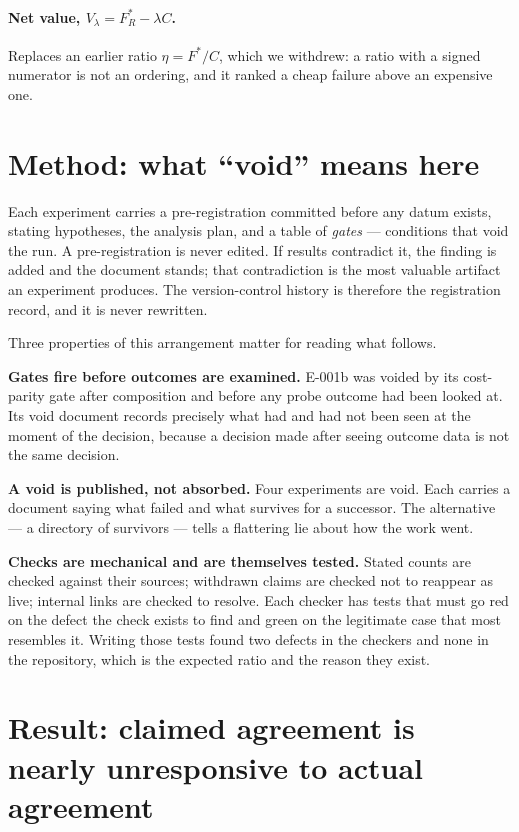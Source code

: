 \documentclass[11pt]{article}
\begin{document}
\paragraph{Net value, $V_\lambda = F^*_R - \lambda C$.} Replaces an earlier ratio
$\eta = F^*/C$, which we withdrew: a ratio with a signed numerator is not an
ordering, and it ranked a cheap failure above an expensive one.

\section{Method: what ``void'' means here}
\label{sec:method}

Each experiment carries a pre-registration committed before any datum exists,
stating hypotheses, the analysis plan, and a table of \emph{gates} --- conditions
that void the run. A pre-registration is never edited. If results contradict it,
the finding is added and the document stands; that contradiction is the most
valuable artifact an experiment produces. The version-control history is
therefore the registration record, and it is never rewritten.

Three properties of this arrangement matter for reading what follows.

\textbf{Gates fire before outcomes are examined.} E-001b was voided by its
cost-parity gate after composition and before any probe outcome had been looked
at. Its void document records precisely what had and had not been seen at the
moment of the decision, because a decision made after seeing outcome data is not
the same decision.

\textbf{A void is published, not absorbed.} Four experiments are void. Each
carries a document saying what failed and what survives for a successor. The
alternative --- a directory of survivors --- tells a flattering lie about how the
work went.

\textbf{Checks are mechanical and are themselves tested.} Stated counts are
checked against their sources; withdrawn claims are checked not to reappear as
live; internal links are checked to resolve. Each checker has tests that must go
red on the defect the check exists to find and green on the legitimate case that
most resembles it. Writing those tests found two defects in the checkers and none
in the repository, which is the expected ratio and the reason they exist.

\section{Result: claimed agreement is nearly unresponsive to actual agreement}
\label{sec:beta}
\end{document}

